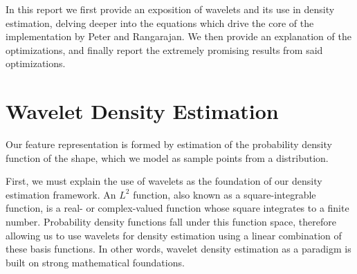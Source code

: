 \documentclass[../tech_report_1.tex]{subfiles}
\begin{document}
In this
report we first provide an exposition of  wavelets and its use in density estimation, delving deeper into the equations which drive the core of the implementation by Peter and Rangarajan. We then provide an explanation of the optimizations, and finally report the extremely promising results from said optimizations. 


\section*{Wavelet Density Estimation}

Our feature representation is formed by estimation of the probability density function of the shape, which we model as sample points from a distribution. 

First, we must explain the use of wavelets as the foundation of our density estimation framework. An $L^{2}$ function, also known as a square-integrable function, is a real- or complex-valued function whose square integrates to a finite number. Probability density functions fall
under this function space, therefore allowing us to use wavelets for
density estimation using a linear combination of these basis functions. In other words, wavelet density estimation  as a paradigm is built on strong mathematical foundations.
\end{document}
